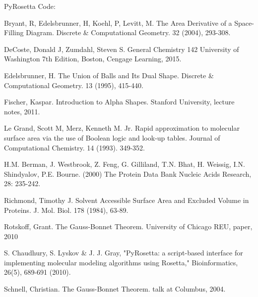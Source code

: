 \documentclass{article}
\begin{document}
PyRosetta Code:


\begin{thebibliography}{10}

Bryant, R, Edelsbrunner, H, Koehl, P, Levitt, M. The Area Derivative of a Space-Filling Diagram. Discrete \& Computational Geometry. 32 (2004), 293-308.

DeCoste, Donald J, Zumdahl, Steven S. General Chemistry 142 University of Washington 7th Edition, Boston, Cengage Learning, 2015.

Edelsbrunner, H. The Union of Balls and Its Dual Shape. Discrete \& Computational Geometry. 13 (1995), 415-440.

Fischer, Kaspar. Introduction to Alpha Shapes. Stanford University, lecture notes, 2011.

Le Grand, Scott M, Merz, Kenneth M. Jr. Rapid approximation to molecular surface area via the use of Boolean logic and look-up tables. Journal of Computational Chemistry. 14 (1993). 349-352.

H.M. Berman, J. Westbrook, Z. Feng, G. Gilliland, T.N. Bhat, H. Weissig, I.N. Shindyalov, P.E. Bourne.
(2000) The Protein Data Bank Nucleic Acids Research, 28: 235-242.

Richmond, Timothy J. Solvent Accessible Surface Area and Excluded Volume in Proteins. J. Mol. Biol. 178 (1984), 63-89.

Rotskoff, Grant. The Gauss-Bonnet Theorem. University of Chicago REU, paper, 2010

S. Chaudhury, S. Lyskov \& J. J. Gray, "PyRosetta: a script-based interface for implementing molecular modeling algorithms using Rosetta," Bioinformatics, 26(5), 689-691 (2010).

Schnell, Christian. The Gauss-Bonnet Theorem. talk at Columbus, 2004.

\end{thebibliography}

\listoffigures
\end{document}
